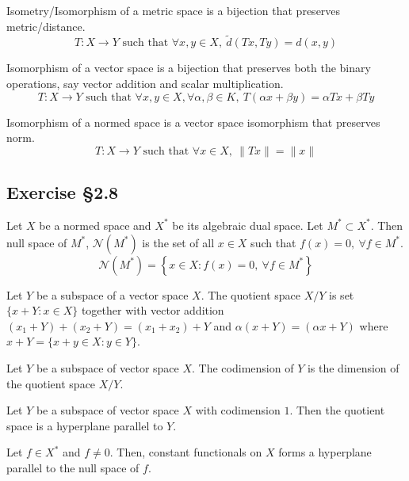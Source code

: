 \begin{definition}[isomorphism]
	Isometry/Isomorphism of a metric space is a bijection that preserves metric/distance.
	\[ T : X \to Y \text{ such that } \forall x,y \in X,\ \tilde{d}(Tx,Ty) = d(x,y) \]

	Isomorphism of a vector space is a bijection that preserves both the binary operations, say vector addition and scalar multiplication.
	\[ T : X \to Y \text{ such that } \forall x,y \in X, \forall \alpha,\beta \in K,\ T(\alpha x + \beta y) = \alpha Tx + \beta Ty \]

	Isomorphism of a normed space is a vector space isomorphism that preserves norm.
	\[ T : X \to Y \text{ such that } \forall x \in X,\ \| Tx \| = \| x \| \]
\end{definition}

\subsection{Exercise \S2.8}
\begin{definition}
	Let $X$ be a normed space and $X^\ast$ be its algebraic dual space.
	Let $M^\ast \subset X^\ast$.
	Then null space of $M^\ast$, $\mathcal{N}(M^\ast)$ is the set of all $x \in X$ such that $f(x) = 0,\ \forall f \in M^\ast$.
	\[ \mathcal{N}(M^\ast) = \left\{ x \in X : f(x) = 0,\ \forall f \in M^\ast \right\} \]
\end{definition}

\begin{definition}
	Let $Y$ be a subspace of a vector space $X$.
	The quotient space $X/Y$ is set $\{ x+Y : x \in X \}$ together with vector addition $(x_1+Y)+(x_2+Y) = (x_1+x_2)+Y$ and $\alpha(x+Y) = (\alpha x + Y)$ where $x+Y = \{ x+y \in X : y \in Y \}$.
\end{definition}
\begin{definition}[codimension]
	Let $Y$ be a subspace of vector space $X$.
	The codimension of $Y$ is the dimension of the quotient space $X/Y$.
\end{definition}

\begin{definition}[hyperplane]
	Let $Y$ be a subspace of vector space $X$ with codimension $1$.
	Then the quotient space is a hyperplane parallel to $Y$.
\end{definition}

\begin{remark}
	Let $f \in X^\ast$ and $f \ne 0$.
	Then, constant functionals on $X$ forms a hyperplane parallel to the null space of $f$.
\end{remark}

